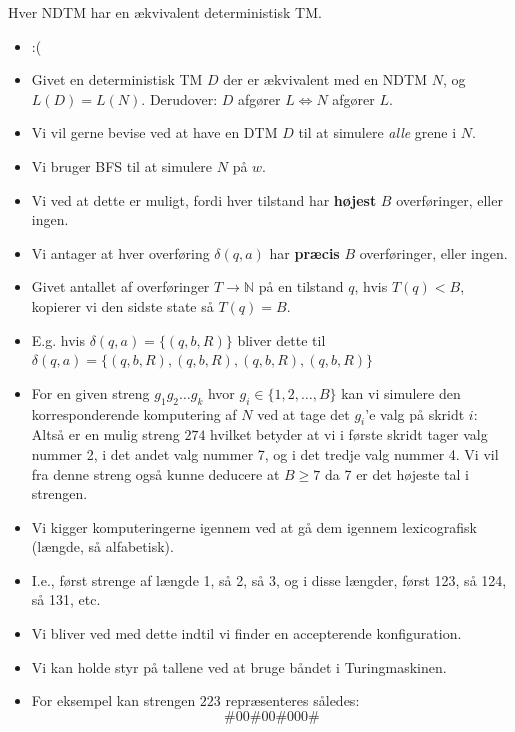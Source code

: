 \begin{frame}[allowframebreaks]
  \begin{theorem}
Hver NDTM har en ækvivalent deterministisk TM.
  \end{theorem}

  \begin{itemize}
    \item :(
    \item Givet en deterministisk TM $D$ der er ækvivalent med en NDTM $N$, og $L(D) = L(N)$. Derudover: $D$ afgører $L \iff N$ afgører $L$.
    \item Vi vil gerne bevise ved at have en DTM $D$ til at simulere \textit{alle} grene i $N$.
    \item Vi bruger BFS til at simulere $N$ på $w$.
    \item Vi ved at dette er muligt, fordi hver tilstand har \textbf{højest} $B$ overføringer, eller ingen.
    \item Vi antager at hver overføring $\delta(q,a)$ har \textbf{præcis} $B$ overføringer, eller ingen.
    \item Givet antallet af overføringer $T \rightarrow \mathbb{N}$ på en tilstand $q$, hvis $T(q) < B$, kopierer vi den sidste state så $T(q) = B$.
    \item E.g. hvis $\delta(q,a) = \{(q,b,R)\}$ bliver dette til $\delta(q,a) = \{(q,b,R),(q,b,R),(q,b,R),(q,b,R)\}$
    \item For en given streng $g_{1}g_{2}\ldots g_{k}$ hvor $g_{i} \in \{1,2, \ldots, B\}$ kan vi simulere den korresponderende komputering af $N$ ved at tage det $g_{i}$'e valg på skridt $i$: Altså er en mulig streng $274$ hvilket betyder at vi i første skridt tager valg nummer 2, i det andet valg nummer 7, og i det tredje valg nummer 4. Vi vil fra denne streng også kunne deducere at $B \ge 7$ da 7 er det højeste tal i strengen.
    \item Vi kigger komputeringerne igennem ved at gå dem igennem lexicografisk (længde, så alfabetisk).
    \item I.e., først strenge af længde 1, så 2, så 3, og i disse længder, først 123, så 124, så 131, etc.
    \item Vi bliver ved med dette indtil vi finder en accepterende konfiguration.
    \item Vi kan holde styr på tallene ved at bruge båndet i Turingmaskinen.
    \item For eksempel kan strengen $223$ repræsenteres således:
          \begin{equation*}
\#00\#00\#000\#
          \end{equation*}

\end{itemize}
\end{frame}
